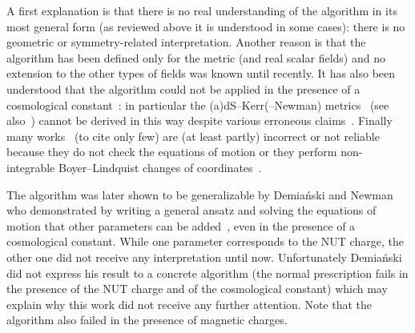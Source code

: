 A first explanation is that there is no real understanding of the algorithm in its most general form (as reviewed above it is understood in some cases): there is no geometric or symmetry-related interpretation.
Another reason is that the algorithm has been defined only for the metric (and real scalar fields) and no extension to the other types of fields was known until recently.
It has also been understood that the algorithm could not be applied in the presence of a cosmological constant~\cite{Demianski:1972:NewKerrlikeSpacetime}: in particular the (a)dS--Kerr(--Newman) metrics~\cite{Carter:1968:HamiltonJacobiSchrodingerSeparable} (see also~\cite{Plebanski:1976:RotatingChargedUniformly, Plebanski:1975:ClassSolutionsEinsteinMaxwell, Gibbons:1977:CosmologicalEventHorizons, Klemm:1997:RotatingTopologicalBlack}) cannot be derived in this way despite various erroneous claims~\cite{Ibohal:2005:RotatingMetricsAdmitting, deUrreta:2015:ExtendedNewmanJanisAlgorithm}.
Finally many works~\cite{Mallett:1988:MetricRotatingRadiating, Viaggiu:2006:InteriorKerrSolutions, Whisker:2008:BraneworldBlackHoles, Lessner:2008:ComplexTrickFivedimensional, Capozziello:2010:AxiallySymmetricSolutions, Caravelli:2010:SpinningLoopBlack, Dadhich:2013:RotatingBlackHole, Ghosh:2013:SpinningHigherDimensional, Ghosh:2015:RotatingBlackHole} (to cite only few) are (at least partly) incorrect or not reliable because they do not check the equations of motion or they perform non-integrable Boyer--Lindquist changes of coordinates~\cite{AzregAinou:2011:CommentSpinningLoop, AzregAinou:2014:GeneratingRotatingRegular, Xu:1998:RadiatingMetricRetarded}.

The algorithm was later shown to be generalizable by Demiański and Newman who demonstrated by writing a general ansatz and solving the equations of motion that other parameters can be added~\cite{Demianski:1966:CombinedKerrNUTSolution, Demianski:1972:NewKerrlikeSpacetime}, even in the presence of a cosmological constant.
While one parameter corresponds to the NUT charge, the other one did not receive any interpretation until now.\footnotemark{}%
Unfortunately Demiański did not express his result to a concrete algorithm (the normal prescription fails in the presence of the NUT charge and of the cosmological constant) which may explain why this work did not receive any further attention.
Note that the algorithm also failed in the presence of magnetic charges.


